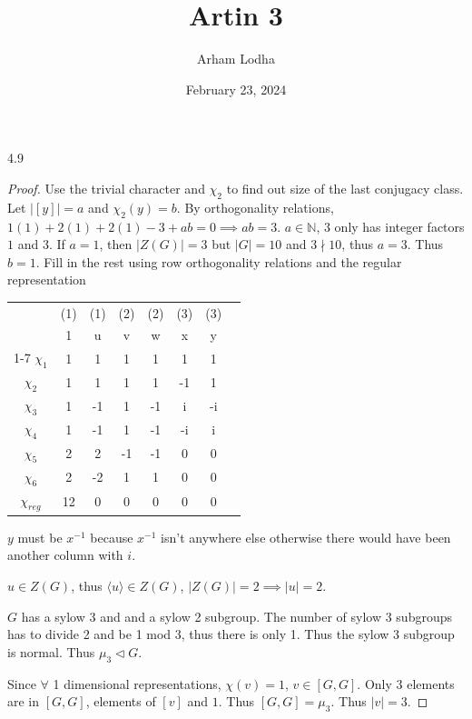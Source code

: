 \documentclass{article}
\newcommand{\N}{\mathbb{N}}
\newcommand{\angles}[1]{\langle #1 \rangle}
\begin{document}
\title{Artin 3}
\author{Arham Lodha}%
\date{February 23, 2024}%
\maketitle

\begin{PROB}{4.9}\label{Problem 4.9.}
\end{PROB}
\begin{proof}

    Use the trivial character and $\chi_2$ to find out size of the last conjugacy class. Let $|[y]| = a$ and $\chi_2(y) = b$. By orthogonality relations, $1(1) + 2(1) + 2(1) - 3 + ab = 0 \implies ab = 3$. $a \in \N$, $3$ only has integer factors $1$ and $3$. If $a = 1$, then $|Z(G)| = 3$ but $|G| =10$ and $3  \nmid 10$, thus $a = 3$. Thus $b = 1$. Fill in the rest using row orthogonality relations and the regular representation 

    \begin{tabular}{c | c c c c c c c }
        & (1) & (1) & (2) & (2) & (3) & (3)  \\
        & 1 & u & v & w & x & y \\
        \cline{1-7}
        $\chi_{1}$ & 1 & 1 & 1 & 1 & 1 & 1 \\
        $\chi_{2}$ & 1 & 1 & 1 & 1 & -1 & 1 \\
        $\chi_{3}$ & 1 & -1 & 1 & -1 & i & -i \\
        $\chi_{4}$ & 1 & -1 & 1 & -1 & -i & i \\
        $\chi_{5}$ & 2 & 2 & -1 & -1 & 0 & 0 \\
        $\chi_{6}$ & 2 & -2 & 1 & 1 & 0 & 0\\
        $\chi_{reg}$ & 12 & 0 & 0 & 0 &0 & 0  
    \end{tabular} 

    $y$ must be $x^{-1}$ because $x^{-1}$ isn't anywhere else otherwise there would have been another column with $i$.    

    $u \in Z(G)$, thus $\angles{u} \in Z(G)$, $|Z(G)| = 2 \implies |u| = 2$. 
    
    
    $G$ has a sylow 3 and and a sylow 2 subgroup. The number of sylow 3 subgroups has to divide 2 and be 1 mod 3, thus there is only 1. Thus the sylow 3 subgroup is normal. Thus $\mu_3 \triangleleft G$.      
    
    Since $\forall$ 1 dimensional representations, $\chi(v) = 1$, $v \in [G, G]$. Only $3$ elements are in $[G, G]$, elements of $[v]$ and $1$. Thus $[G, G] = \mu_3$. Thus $|v| = 3$. 
    

\end{proof}
\end{document}
